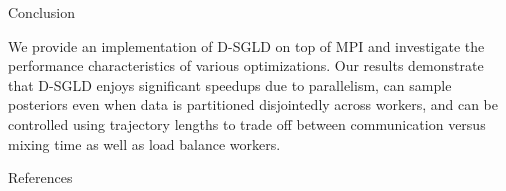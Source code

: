\documentclass[final]{beamer}
\newlength{\onecolwid}
\begin{document}
\begin{frame}[t]
\begin{columns}[t]
\begin{column}{\onecolwid}

\begin{block}{Conclusion}

  We provide an implementation of D-SGLD on top of MPI and investigate the performance
  characteristics of various optimizations. Our results demonstrate that D-SGLD enjoys
  significant speedups due to parallelism, can sample posteriors even when data is partitioned
  disjointedly across workers, and can be controlled using trajectory lengths to trade off
  between communication versus mixing time as well as load balance workers.
\end{block}






\begin{block}{References}

\nocite{*} %
\small{
\vspace{0.75in}}

\end{block}



\end{column}
\end{columns}
\end{frame}
\end{document}
